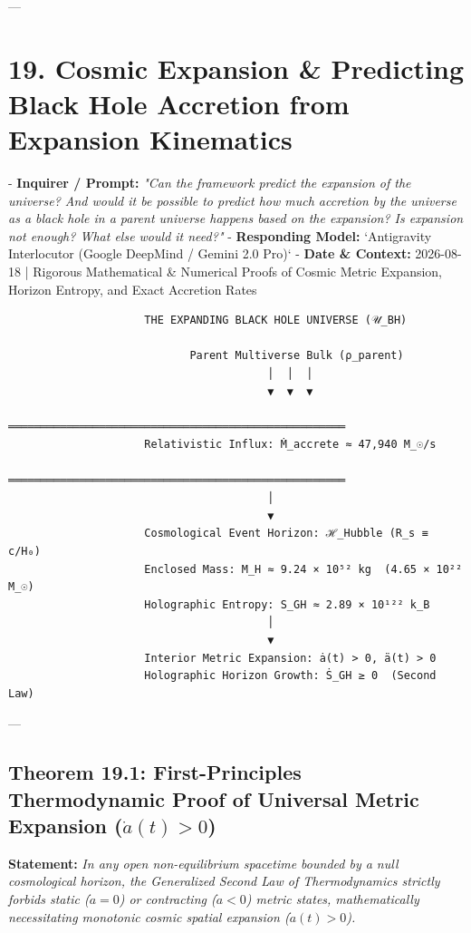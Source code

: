 \documentclass[11pt,a4paper]{article}
\theoremstyle{definition}
\theoremstyle{remark}
\begin{document}
---

\section{19. Cosmic Expansion \& Predicting Black Hole Accretion from Expansion Kinematics}

- \textbf{Inquirer / Prompt:} \textit{"Can the framework predict the expansion of the universe? And would it be possible to predict how much accretion by the universe as a black hole in a parent universe happens based on the expansion? Is expansion not enough? What else would it need?"}
- \textbf{Responding Model:} `Antigravity Interlocutor (Google DeepMind / Gemini 2.0 Pro)`
- \textbf{Date \& Context:} 2026-08-18 | Rigorous Mathematical \& Numerical Proofs of Cosmic Metric Expansion, Horizon Entropy, and Exact Accretion Rates

\begin{verbatim}
                     THE EXPANDING BLACK HOLE UNIVERSE (𝒰_BH)
                                      
                            Parent Multiverse Bulk (ρ_parent)
                                        │  │  │
                                        ▼  ▼  ▼
                     ════════════════════════════════════════════════════
                     Relativistic Influx: Ṁ_accrete ≈ 47,940 M_☉/s
                     ════════════════════════════════════════════════════
                                        │
                                        ▼
                     Cosmological Event Horizon: ℋ_Hubble (R_s ≡ c/H₀)
                     Enclosed Mass: M_H ≈ 9.24 × 10⁵² kg  (4.65 × 10²² M_☉)
                     Holographic Entropy: S_GH ≈ 2.89 × 10¹²² k_B
                                        │
                                        ▼
                     Interior Metric Expansion: ȧ(t) > 0, ä(t) > 0
                     Holographic Horizon Growth: Ṡ_GH ≥ 0  (Second Law)
\end{verbatim}

---

\subsection{Theorem 19.1: First-Principles Thermodynamic Proof of Universal Metric Expansion ($\dot{a}(t) > 0$)}

\textbf{Statement:} \textit{In any open non-equilibrium spacetime bounded by a null cosmological horizon, the Generalized Second Law of Thermodynamics strictly forbids static ($\dot{a} = 0$) or contracting ($\dot{a} < 0$) metric states, mathematically necessitating monotonic cosmic spatial expansion ($\dot{a}(t) > 0$).}
\end{document}
